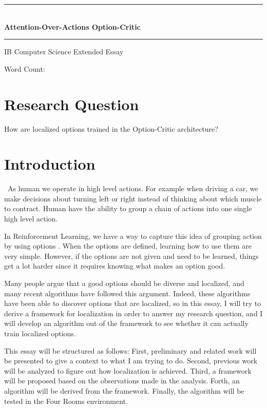 \documentclass{article}
\date{}
\begin{document}
	\begin{center}
		\large{\rule{420pt}{0.4pt}}\\
		\vspace{0.15in}
		\LARGE{\bfseries{Attention-Over-Actions Option-Critic}}
		\vspace{0.1in}
		\large{\rule{420pt}{0.4pt}}
		
		\large{IB Computer Science Extended Essay}
		
		\normalsize{Word Count:}
	\end{center}
	\vspace{0.1in}
	\section*{Research Question}
	How are localized options trained in the Option-Critic architecture? \\
	\vspace{0.1in}
	\section{Introduction}
	\qquad \ As human we operate in high level actions. For example when driving a car, we make decisions about turning left or right instead of thinking about which muscle to contract. Human have the ability to group a chain of actions into one single high level action. 
	
	\quad In Reinforcement Learning, we have a way to capture this idea of grouping action by using options \cite{SUTTON1999181}. When the options are defined, learning how to use them are very simple. However, if the options are not given and need to be learned, things get a lot harder since it requires knowing what makes an option good. 

	\quad Many people argue that a good options should be diverse and localized, and many recent algorithms have followed this argument. Indeed, these algorithms have been able to discover options that are localized, so in this essay, I will try to derive a framework for localization in order to answer my research question, and I will develop an algorithm out of the framework to see whether it can actually train localized options. 
	
	\quad This essay will be structured as follows: First, preliminary and related work will be presented to give a context to what I am trying to do. Second, previous work will be analyzed to figure out how localization is achieved. Third, a framework will be proposed based on the observations made in the analysis. Forth, an algorithm will be derived from the framework. Finally, the algorithm will be tested in the Four Rooms environment.
\end{document}
